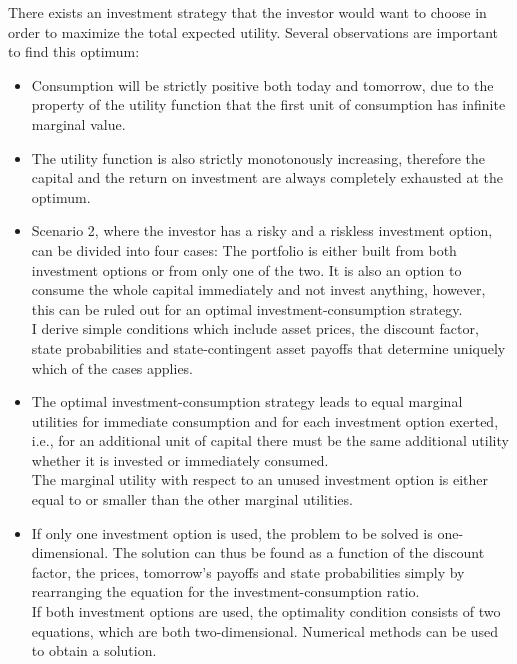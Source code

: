 There exists an investment strategy that the investor would want to choose in order to maximize the total expected utility. Several observations are important to find this optimum:\\

\begin{itemize}
    \item Consumption will be strictly positive both today and tomorrow, due to the property of the utility function that the first unit of consumption has infinite marginal value. \\
    
    \item The utility function is also strictly monotonously increasing, therefore the capital and the return on investment are always completely exhausted at the optimum.\\
    
    \item Scenario 2, where the investor has a risky and a riskless investment option, can be divided into four cases: The portfolio is either built from both investment options or from only one of the two. It is also an option to consume the whole capital immediately and not invest anything, however, this can be ruled out for an optimal investment-consumption strategy.\\
    I derive simple conditions which include asset prices, the discount factor, state probabilities and state-contingent asset payoffs that determine uniquely which of the cases applies.\\
    
    \item The optimal investment-consumption strategy leads to equal marginal utilities for immediate consumption and for each investment option exerted, i.e., for an additional unit of capital there must be the same additional utility whether it is invested or immediately consumed.\\
    The marginal utility with respect to an unused investment option is either equal to or smaller than the other marginal utilities.\\
    
    \item If only one investment option is used, the problem to be solved is one-dimensional. The solution can thus be found as a function of the discount factor, the prices, tomorrow's payoffs and state probabilities simply by rearranging the equation for the investment-consumption ratio.\\
    If both investment options are used, the optimality condition consists of two equations, which are both two-dimensional. Numerical methods can be used to obtain a solution.\\
    

\end{itemize}
